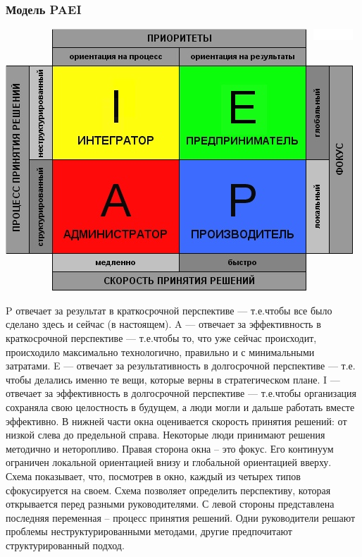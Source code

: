 \documentclass{../industrial-development}
\begin{document}
\begin{frame} \frametitle{Модель PAEI}
{\includegraphics[width=0.95\linewidth]{paei.png}}
\end{frame}
\lecturenotes
P отвечает за результат в краткосрочной перспективе — т.е.чтобы все было сделано здесь и сейчас (в настоящем).
A — отвечает за эффективность в краткосрочной перспективе — т.е.чтобы то, что уже сейчас происходит, происходило максимально технологично, правильно и с минимальными затратами.
E — отвечает за результативность в долгосрочной перспективе — т.е. чтобы делались именно те вещи, которые верны в стратегическом плане.
I — отвечает за эффективность в долгосрочной перспективе — т.е.чтобы организация сохраняла свою целостность в будущем, а люди могли и дальше работать вместе эффективно.
В нижней части окна оценивается скорость принятия решений: от низкой слева до предельной справа. Некоторые люди принимают решения методично и неторопливо.
Правая сторона окна – это фокус. Его континуум ограничен локальной ориентацией внизу и глобальной ориентацией вверху. Схема показывает, что, посмотрев в окно, каждый из четырех типов сфокусируется на своем. Схема позволяет определить перспективу, которая открывается перед разными руководителями.
С левой стороны представлена последняя переменная – процесс принятия решений. Одни руководители решают проблемы неструктурированными методами, другие предпочитают структурированный подход. 
\end{document}
